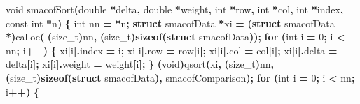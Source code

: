 \documentclass[
  12pt,
]{article}
\newenvironment{Shaded}{\begin{snugshade}}{\end{snugshade}}
\newcommand{\ControlFlowTok}[1]{\textcolor[rgb]{0.13,0.29,0.53}{\textbf{#1}}}
\newcommand{\DataTypeTok}[1]{\textcolor[rgb]{0.13,0.29,0.53}{#1}}
\newcommand{\DecValTok}[1]{\textcolor[rgb]{0.00,0.00,0.81}{#1}}
\newcommand{\KeywordTok}[1]{\textcolor[rgb]{0.13,0.29,0.53}{\textbf{#1}}}
\newcommand{\NormalTok}[1]{#1}
\newcommand{\OperatorTok}[1]{\textcolor[rgb]{0.81,0.36,0.00}{\textbf{#1}}}
\begin{document}
\begin{Shaded}
\begin{Highlighting}[]
\DataTypeTok{void}\NormalTok{ smacofSort}\OperatorTok{(}\DataTypeTok{double} \OperatorTok{*}\NormalTok{delta}\OperatorTok{,} \DataTypeTok{double} \OperatorTok{*}\NormalTok{weight}\OperatorTok{,} \DataTypeTok{int} \OperatorTok{*}\NormalTok{row}\OperatorTok{,} \DataTypeTok{int} \OperatorTok{*}\NormalTok{col}\OperatorTok{,} \DataTypeTok{int} \OperatorTok{*}\NormalTok{index}\OperatorTok{,}
                \DataTypeTok{const} \DataTypeTok{int} \OperatorTok{*}\NormalTok{n}\OperatorTok{)} \OperatorTok{\{}
    \DataTypeTok{int}\NormalTok{ nn }\OperatorTok{=} \OperatorTok{*}\NormalTok{n}\OperatorTok{;}
    \KeywordTok{struct}\NormalTok{ smacofData }\OperatorTok{*}\NormalTok{xi }\OperatorTok{=} \OperatorTok{(}\KeywordTok{struct}\NormalTok{ smacofData }\OperatorTok{*)}\NormalTok{calloc}\OperatorTok{(}
        \OperatorTok{(}\DataTypeTok{size\_t}\OperatorTok{)}\NormalTok{nn}\OperatorTok{,} \OperatorTok{(}\DataTypeTok{size\_t}\OperatorTok{)}\KeywordTok{sizeof}\OperatorTok{(}\KeywordTok{struct}\NormalTok{ smacofData}\OperatorTok{));}
    \ControlFlowTok{for} \OperatorTok{(}\DataTypeTok{int}\NormalTok{ i }\OperatorTok{=} \DecValTok{0}\OperatorTok{;}\NormalTok{ i }\OperatorTok{\textless{}}\NormalTok{ nn}\OperatorTok{;}\NormalTok{ i}\OperatorTok{++)} \OperatorTok{\{}
\NormalTok{        xi}\OperatorTok{[}\NormalTok{i}\OperatorTok{].}\NormalTok{index }\OperatorTok{=}\NormalTok{ i}\OperatorTok{;}
\NormalTok{        xi}\OperatorTok{[}\NormalTok{i}\OperatorTok{].}\NormalTok{row }\OperatorTok{=}\NormalTok{ row}\OperatorTok{[}\NormalTok{i}\OperatorTok{];}
\NormalTok{        xi}\OperatorTok{[}\NormalTok{i}\OperatorTok{].}\NormalTok{col }\OperatorTok{=}\NormalTok{ col}\OperatorTok{[}\NormalTok{i}\OperatorTok{];}
\NormalTok{        xi}\OperatorTok{[}\NormalTok{i}\OperatorTok{].}\NormalTok{delta }\OperatorTok{=}\NormalTok{ delta}\OperatorTok{[}\NormalTok{i}\OperatorTok{];}
\NormalTok{        xi}\OperatorTok{[}\NormalTok{i}\OperatorTok{].}\NormalTok{weight }\OperatorTok{=}\NormalTok{ weight}\OperatorTok{[}\NormalTok{i}\OperatorTok{];}
    \OperatorTok{\}}
    \OperatorTok{(}\DataTypeTok{void}\OperatorTok{)}\NormalTok{qsort}\OperatorTok{(}\NormalTok{xi}\OperatorTok{,} \OperatorTok{(}\DataTypeTok{size\_t}\OperatorTok{)}\NormalTok{nn}\OperatorTok{,} \OperatorTok{(}\DataTypeTok{size\_t}\OperatorTok{)}\KeywordTok{sizeof}\OperatorTok{(}\KeywordTok{struct}\NormalTok{ smacofData}\OperatorTok{),}
\NormalTok{                smacofComparison}\OperatorTok{);}
    \ControlFlowTok{for} \OperatorTok{(}\DataTypeTok{int}\NormalTok{ i }\OperatorTok{=} \DecValTok{0}\OperatorTok{;}\NormalTok{ i }\OperatorTok{\textless{}}\NormalTok{ nn}\OperatorTok{;}\NormalTok{ i}\OperatorTok{++)} \OperatorTok{\{}

\end{Highlighting}
\end{Shaded}
\end{document}
